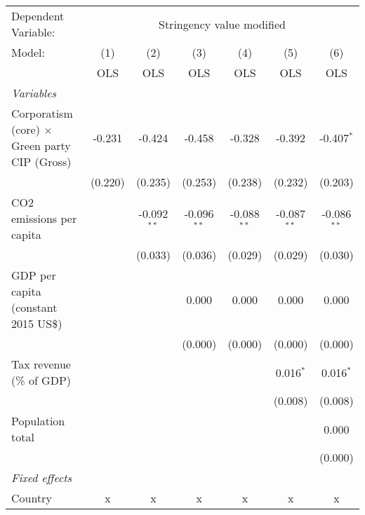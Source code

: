 
\begingroup
\centering
\begin{tabular}{lcccccc}
   \toprule
   Dependent Variable: & \multicolumn{6}{c}{Stringency value modified}\\
   Model:                                               & (1)     & (2)           & (3)           & (4)           & (5)           & (6)\\  
                                                        &  OLS    & OLS           & OLS           & OLS           & OLS           & OLS\\  
   \midrule
   \emph{Variables}\\
   Corporatism (core) $\times$ Green party CIP (Gross)  & -0.231  & -0.424        & -0.458        & -0.328        & -0.392        & -0.407$^{*}$\\   
                                                        & (0.220) & (0.235)       & (0.253)       & (0.238)       & (0.232)       & (0.203)\\   
   CO2 emissions per capita                             &         & -0.092$^{**}$ & -0.096$^{**}$ & -0.088$^{**}$ & -0.087$^{**}$ & -0.086$^{**}$\\   
                                                        &         & (0.033)       & (0.036)       & (0.029)       & (0.029)       & (0.030)\\   
   GDP per capita (constant 2015 US\$)                  &         &               & 0.000         & 0.000         & 0.000         & 0.000\\   
                                                        &         &               & (0.000)       & (0.000)       & (0.000)       & (0.000)\\   
   Tax revenue (\% of GDP)                              &         &               &               &               & 0.016$^{*}$   & 0.016$^{*}$\\   
                                                        &         &               &               &               & (0.008)       & (0.008)\\   
   Population total                                     &         &               &               &               &               & 0.000\\   
                                                        &         &               &               &               &               & (0.000)\\   
   \emph{Fixed effects}\\
   Country                                              & x       & x             & x             & x             & x             & x\\  

\end{tabular}
